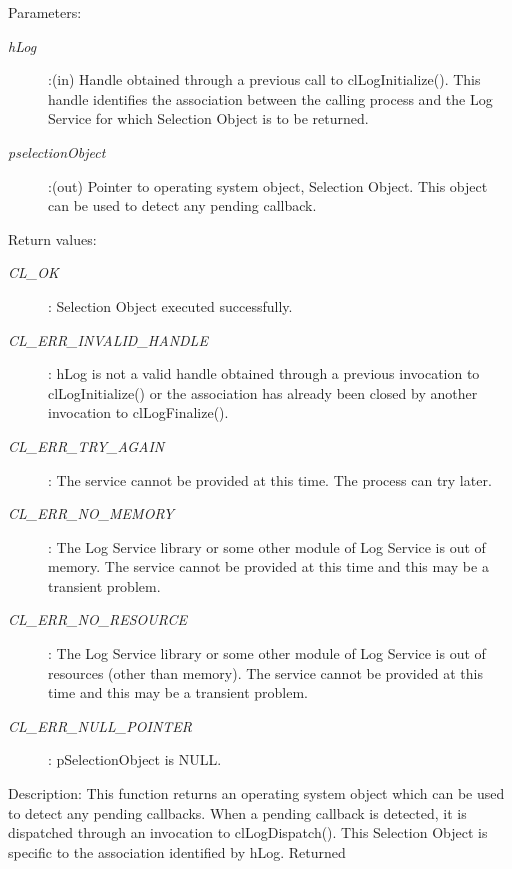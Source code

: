 \begin{flushleft}
\begin{Desc}
\begin{verbatim}
\end{verbatim}
\normalsize
\end{Desc}
\begin{Desc}
\item[Parameters:] \begin{description}
\item[{\em hLog}]:(in) Handle obtained through a previous call to clLogInitialize(). This handle identifies the association between the calling process 
and the Log Service for which Selection Object is to be returned.
\item[{\em pselectionObject}]:(out) Pointer to operating system object, Selection Object. This object can be used to detect any pending callback.
\end{description}
\end{Desc}
\begin{Desc}
\item[Return values:]
\begin{description}
\item[{\em CL\_\-OK}]: Selection Object executed successfully.
\item[{\em CL\_\-ERR\_\-INVALID\_\-HANDLE}]: hLog is not a valid handle obtained through a previous invocation to 
clLogInitialize() or the association has already been closed by another invocation to clLogFinalize().
\item[{\em CL\_\-ERR\_\-TRY\_\-AGAIN}]: The service cannot be provided at this time. The process can try later.
\item[{\em CL\_\-ERR\_\-NO\_\-MEMORY}]: The Log Service library or some other module of Log Service is out of memory. The service cannot 
be provided at this time and this may be a transient problem.
\item[{\em CL\_\-ERR\_\-NO\_\-RESOURCE}]: The Log Service library or some other module of Log Service is out of resources 
(other than memory). The service cannot be provided at this time and this may be a transient problem.
\item[{\em CL\_\-ERR\_\-NULL\_\-POINTER}]: pSelectionObject is NULL.
\end{description}
\end{Desc}
\begin{Desc}
\item[Description:] This function returns an operating system object which can be used to detect any pending callbacks. When a pending callback is
detected, it is dispatched through an invocation to clLogDispatch(). This Selection Object is specific to the association identified by hLog. Returned

\end{Desc}
\end{flushleft}
